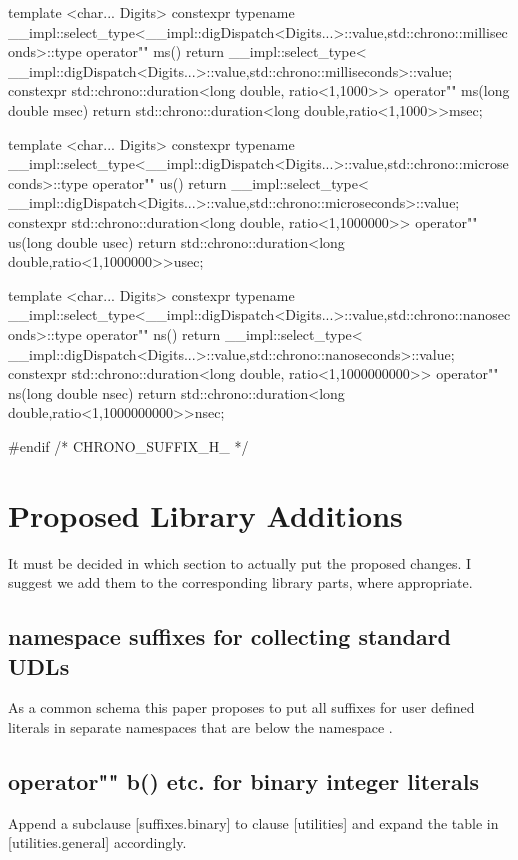 \documentclass[ebook,11pt,article]{memoir}
\begin{document}
\begin{codeblock}
{{{template <char... Digits>
constexpr typename 
__impl::select_type<__impl::digDispatch<Digits...>::value,std::chrono::milliseconds>::type
operator"" ms(){
	return __impl::select_type<
	__impl::digDispatch<Digits...>::value,std::chrono::milliseconds>::value;
}
constexpr std::chrono::duration<long double, ratio<1,1000>> operator"" ms(long double msec){
	return std::chrono::duration<long double,ratio<1,1000>>{msec};
}

template <char... Digits>
constexpr typename 
__impl::select_type<__impl::digDispatch<Digits...>::value,std::chrono::microseconds>::type
operator"" us(){
	return __impl::select_type<
	__impl::digDispatch<Digits...>::value,std::chrono::microseconds>::value;
}
constexpr std::chrono::duration<long double, ratio<1,1000000>> operator"" us(long double usec){
	return std::chrono::duration<long double,ratio<1,1000000>>{usec};
}

template <char... Digits>
constexpr typename 
__impl::select_type<__impl::digDispatch<Digits...>::value,std::chrono::nanoseconds>::type
operator"" ns(){
	return __impl::select_type<
	__impl::digDispatch<Digits...>::value,std::chrono::nanoseconds>::value;
}
constexpr std::chrono::duration<long double, ratio<1,1000000000>> operator"" ns(long double nsec){
	return std::chrono::duration<long double,ratio<1,1000000000>>{nsec};
}
}}}
#endif /* CHRONO_SUFFIX_H_ */
\end{codeblock}



\chapter{Proposed Library Additions}
It must be decided in which section to actually put the proposed changes. I suggest we add them to the corresponding library parts, where appropriate.
\section{namespace suffixes for collecting standard UDLs}
As a common schema this paper proposes to put all suffixes for user defined literals in separate namespaces that are below the namespace . 

\section{operator"" b() etc. for binary integer literals}
Append a subclause [suffixes.binary] to clause [utilities] and expand the table in [utilities.general] accordingly.
\end{document}
